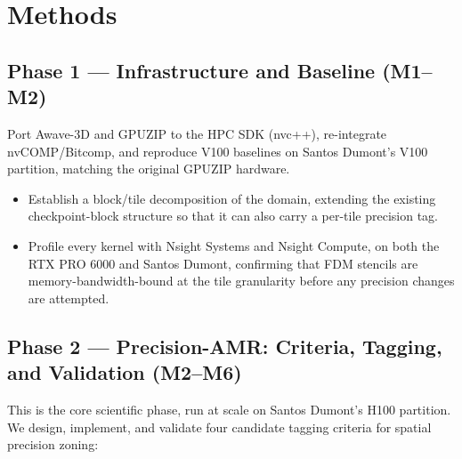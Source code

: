 \documentclass[12pt,a4paper]{article}
\begin{document}
\fi

\iffalse

\section{Methods}

\subsection{Phase 1 --- Infrastructure and Baseline (M1--M2)}

Port Awave-3D and GPUZIP to the HPC SDK (nvc++), re-integrate nvCOMP/Bitcomp, and
reproduce V100 baselines on Santos Dumont's V100 partition, matching the original
GPUZIP hardware.

\begin{itemize}
  \item Establish a block/tile decomposition of the domain, extending the
        existing checkpoint-block structure so that it can also carry a per-tile
        precision tag.
  \item Profile every kernel with Nsight Systems and Nsight Compute, on both the
        RTX PRO 6000 and Santos Dumont, confirming that FDM stencils are
        memory-bandwidth-bound at the tile granularity before any precision
        changes are attempted.
\end{itemize}

\subsection{Phase 2 --- Precision-AMR: Criteria, Tagging, and Validation (M2--M6)}

This is the core scientific phase, run at scale on Santos Dumont's H100
partition. We design, implement, and validate four candidate tagging criteria for
spatial precision zoning:
\end{document}
